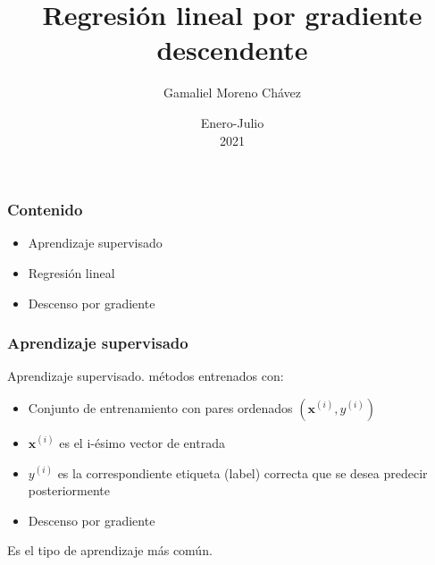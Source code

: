\documentclass[spanish]{beamer}
\begin{document}
\title{Regresión lineal por gradiente descendente}
\author{Gamaliel Moreno Chávez}
\date{Enero-Julio\\ 2021}%

\frame{\titlepage}

\begin{frame}
\frametitle{Contenido}
\begin{itemize}
\item Aprendizaje supervisado
\item Regresión lineal 
\item Descenso por gradiente
\end{itemize}
\end{frame}

\begin{frame}
\frametitle{Aprendizaje supervisado}
Aprendizaje supervisado. métodos entrenados con:

\begin{itemize}
\item Conjunto de entrenamiento con pares ordenados $(\mathbf{x}^{(i)},y^{(i)})$
\item $\mathbf{x}^{(i)}$ es el i-ésimo vector de entrada 
\item $y^{(i)}$ es la correspondiente etiqueta (label) correcta que se desea predecir posteriormente
\item Descenso por gradiente
\end{itemize}

Es el tipo de aprendizaje más común.
\end{frame}


\end{document}
